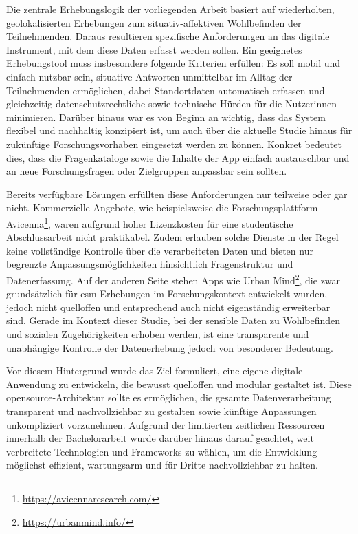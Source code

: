 Die zentrale Erhebungslogik der vorliegenden Arbeit basiert auf wiederholten, geolokalisierten Erhebungen zum situativ-affektiven Wohlbefinden der Teilnehmenden. Daraus resultieren spezifische Anforderungen an das digitale Instrument, mit dem diese Daten erfasst werden sollen. Ein geeignetes Erhebungstool muss insbesondere folgende Kriterien erfüllen: Es soll mobil und einfach nutzbar sein, situative Antworten unmittelbar im Alltag der Teilnehmenden ermöglichen, dabei Standortdaten automatisch erfassen und gleichzeitig datenschutzrechtliche sowie technische Hürden für die Nutzer\genderstern innen minimieren. Darüber hinaus war es von Beginn an wichtig, dass das System flexibel und nachhaltig konzipiert ist, um auch über die aktuelle Studie hinaus für zukünftige Forschungsvorhaben eingesetzt werden zu können. Konkret bedeutet dies, dass die Fragenkataloge sowie die Inhalte der App einfach austauschbar und an neue Forschungsfragen oder Zielgruppen anpassbar sein sollten.

Bereits verfügbare Lösungen erfüllten diese Anforderungen nur teilweise oder gar nicht. Kommerzielle Angebote, wie beispielsweise die Forschungsplattform Avicenna\footnote{\href{https://avicennaresearch.com/}{https://avicennaresearch.com/}}, waren aufgrund hoher Lizenzkosten für eine studentische Abschlussarbeit nicht praktikabel. Zudem erlauben solche Dienste in der Regel keine vollständige Kontrolle über die verarbeiteten Daten und bieten nur begrenzte Anpassungsmöglichkeiten hinsichtlich Fragenstruktur und Datenerfassung. Auf der anderen Seite stehen Apps wie Urban Mind\footnote{\href{https://urbanmind.info/}{https://urbanmind.info/}}, die zwar grundsätzlich für \gls{esm}-Erhebungen im Forschungskontext entwickelt wurden, jedoch nicht quelloffen und entsprechend auch nicht eigenständig erweiterbar sind. Gerade im Kontext dieser Studie, bei der sensible Daten zu Wohlbefinden und sozialen Zugehörigkeiten erhoben werden, ist eine transparente und unabhängige Kontrolle der Datenerhebung jedoch von besonderer Bedeutung.

Vor diesem Hintergrund wurde das Ziel formuliert, eine eigene digitale Anwendung zu entwickeln, die bewusst quelloffen und modular gestaltet ist. Diese \gls{opensource}-Architektur sollte es ermöglichen, die gesamte Datenverarbeitung transparent und nachvollziehbar zu gestalten sowie künftige Anpassungen unkompliziert vorzunehmen. Aufgrund der limitierten zeitlichen Ressourcen innerhalb der Bachelorarbeit wurde darüber hinaus darauf geachtet, weit verbreitete Technologien und Frameworks zu wählen, um die Entwicklung möglichst effizient, wartungsarm und für Dritte nachvollziehbar zu halten.

